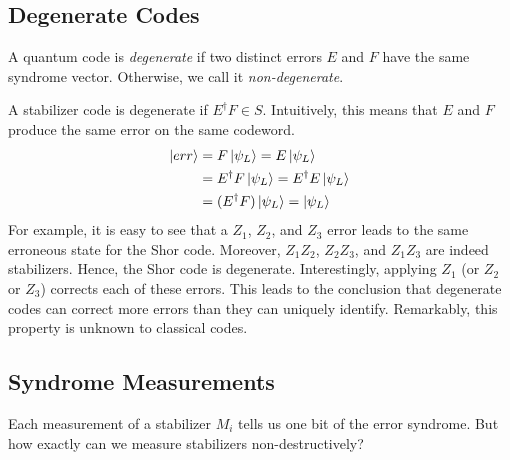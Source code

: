

\subsection{Degenerate Codes}

A quantum code is \textit{degenerate} if two distinct errors $E$ and $F$ have the same syndrome vector. Otherwise, we call it \textit{non-degenerate}. 

\smallskip

\noindent
A stabilizer code is degenerate if $E^{\dagger}F \in S$. Intuitively, this means that $E$ and $F$ produce the same error on the same codeword.
\begin{equation}
    \begin{aligned}
        \ket{err} &= F\ket{\psi_{L}} = E\ket{\psi_{L}}\\
        &= E^{\dagger}F\ket{\psi_{L}} = E^{\dagger}E\ket{\psi_{L}} \\
        &= (E^{\dagger}F)\ket{\psi_{L}} = \ket{\psi_{L}}
    \end{aligned}
\end{equation}
For example, it is easy to see that a $Z_{1}$, $Z_{2}$, and $Z_{3}$ error leads to the same erroneous state for the Shor code. Moreover, $Z_{1}Z_{2}$, $Z_{2}Z_{3}$, and $Z_{1}Z_{3}$ are indeed stabilizers. Hence, the Shor code is degenerate. Interestingly, applying $Z_1$ (or $Z_2$ or $Z_3$) corrects each of these errors. This leads to the conclusion that degenerate codes can correct more errors than they can uniquely identify. Remarkably, this property is unknown to classical codes.

\subsection{Syndrome Measurements}

Each measurement of a stabilizer $M_{i}$ tells us one bit of the error syndrome. But how exactly can we measure stabilizers non-destructively?

